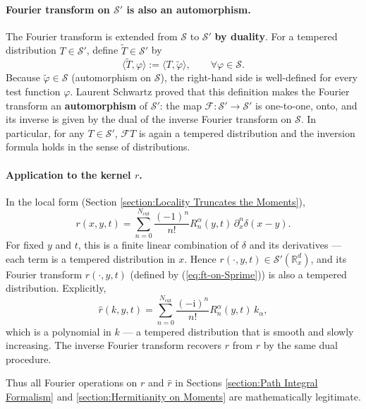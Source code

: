 \documentclass{book}
\newcommand{\assign}{:=}
\newcommand{\mathi}{\mathrm{i}}
\newcommand{\tmop}[1]{\ensuremath{\operatorname{#1}}}
\newcommand{\tmstrong}[1]{\textbf{#1}}
\begin{document}
\paragraph{Fourier transform on $\mathcal{S}'$ is also an automorphism.}
The Fourier transform is extended from $\mathcal{S}$ to $\mathcal{S}'$
{\tmstrong{by duality}}.  For a tempered distribution $T \in
\mathcal{S}'$, define $\tilde T \in \mathcal{S}'$ by
\begin{equation}
  \langle \tilde T, \varphi \rangle \assign \langle T, \tilde \varphi
  \rangle, \qquad \forall \varphi \in \mathcal{S}.
  \label{eq:ft-on-Sprime}
\end{equation}
Because $\tilde \varphi \in \mathcal{S}$ (automorphism on $\mathcal{S}$),
the right-hand side is well-defined for every test function $\varphi$.
Laurent Schwartz proved that this definition makes the Fourier transform
an {\tmstrong{automorphism}} of $\mathcal{S}'$: the map
$\mathcal{F} : \mathcal{S}' \to \mathcal{S}'$ is one-to-one, onto, and its
inverse is given by the dual of the inverse Fourier transform on
$\mathcal{S}$.  In particular, for any $T \in \mathcal{S}'$,
$\mathcal{F} T$ is again a tempered distribution and the inversion formula
holds in the sense of distributions.

\paragraph{Application to the kernel $r$.}
In the local form (Section \ref{section:Locality Truncates the Moments}),
\[ r (x, y, t) = \sum_{n = 0}^{N_{\tmop{cut}}} \frac{(- 1)^n}{n!}
   R_n^{\alpha} (y, t) \, \partial_x^n \delta (x - y) . \]
For fixed $y$ and $t$, this is a finite linear combination of $\delta$ and
its derivatives --- each term is a tempered distribution in $x$.  Hence
$r (\cdot, y, t) \in \mathcal{S}' (\mathbb{R}^d_x)$, and its Fourier
transform $\hat{r} (\cdot, y, t)$ (defined by
(\ref{eq:ft-on-Sprime})) is also a tempered distribution.  Explicitly,
\begin{equation}
  \hat{r} (k, y, t) = \sum_{n = 0}^{N_{\tmop{cut}}}
  \frac{(- \mathi)^n}{n!} R_n^{\alpha} (y, t) \, k_{\alpha},
  \label{eq:rhat-polynomial}
\end{equation}
which is a polynomial in $k$ --- a tempered distribution that is smooth
and slowly increasing.  The inverse Fourier transform recovers $r$ from
$\hat{r}$ by the same dual procedure.

Thus all Fourier operations on $r$ and $\hat{r}$ in Sections
\ref{section:Path Integral Formalism} and
\ref{section:Hermitianity on Moments} are mathematically legitimate.
\end{document}
